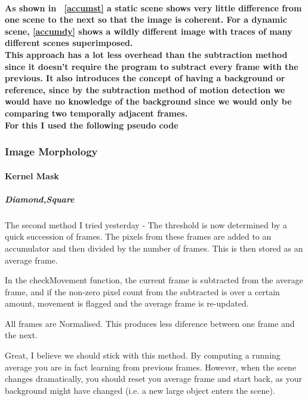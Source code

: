 \documentclass[11pt]{article} %
\begin{document}
{\paragraph{As shown in ~\cref{accumst} a static scene shows very little difference from one scene to the next so that the image is coherent. For a dynamic scene, \cref{accumdy} shows a wildly different image with traces of many different scenes superimposed.
\\This approach has a lot less overhead than the subtraction method since it doesn’t require the program to subtract every frame with the previous. It also introduces the concept of having a background or reference, since by the subtraction method of motion detection we would have no knowledge of the background since we would only be comparing two temporally adjacent frames.
\\For this I used the following pseudo code
}
\begin{frame}[fragile]
	
\end{frame}



\subsubsection{Image Morphology}
\paragraph{Kernel Mask}
\subparagraph{Diamond,Square}



    The second method I tried yesterday - The threshold is now determined by a
    quick succession of frames. The pixels from these frames are added to an
    accumulator and then divided by the number of frames.
    This is then stored as an average frame.

    In the checkMovement function, the current frame is subtracted from the
    average frame, and if the non-zero pixel count from the subtracted is over
    a certain amount, movement is flagged and the average frame is re-updated.

    All frames are Normalised. This produces less diference between one frame
    and the next.


Great, I believe we should stick with this method. By computing a running average you are in fact learning from previous frames. However, when the scene changes dramatically, you should reset you average frame and start back, as your background might have changed (i.e. a new large object enters the scene).
 


}
\end{document}
